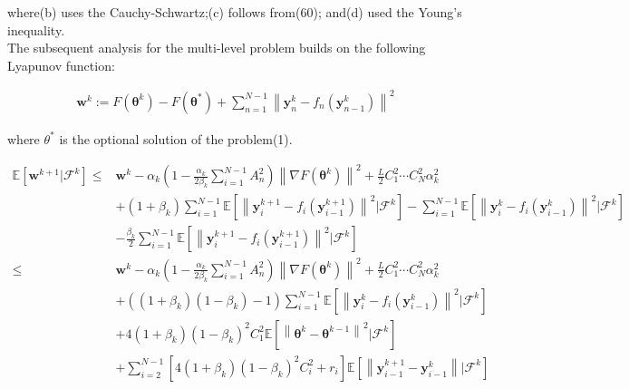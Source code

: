 where(b) uses the Cauchy-Schwartz;(c) follows from(60); and(d) used the Young's inequality.\\
The subsequent analysis for the multi-level problem builds on the following Lyapunov function:

\begin{equation*}
\begin{split}
\boldsymbol{w}^k:=F(\boldsymbol{\theta}^k)-F(\boldsymbol{\theta}^*)+\sum_{n=1}^{N-1}\left \| \boldsymbol{y}_n^k-f_n(\boldsymbol{y}_{n-1}^k) \right \|^2
\end{split}
\end{equation*}

where $\theta^*$ is the optional solution of the problem(1).

\begin{equation*}
\begin{split}
\mathbb{E}\left [ \boldsymbol{w}^{k+1}|\mathcal{F}^k \right ]\leq &\boldsymbol{w}^k-\alpha_k\left ( 1-\frac{\alpha_k}{2\beta_k}\sum_{i=1}^{N-1}A_n^2 \right )\left \| \nabla F\left ( \boldsymbol{\theta}^k \right ) \right \|^2+\frac{L}{2}C_1^2\cdots C_N^2\alpha_k^2\\
&+(1+\beta_k)\sum_{i=1}^{N-1}\mathbb{E}\left [ \left \| \boldsymbol{y}_i^{k+1}-f_i\left ( \boldsymbol{y}_{i-1}^{k+1} \right ) \right \|^2 |\mathcal{F}^k \right ]-\sum_{i=1}^{N-1}\mathbb{E}\left [ \left \| \boldsymbol{y}_i^{k}-f_i\left ( \boldsymbol{y}_{i-1}^{k} \right ) \right \|^2 |\mathcal{F}^k \right ]\\
&-\frac{\beta_k}{2}\sum_{i=1}^{N-1}\mathbb{E}\left [ \left \| \boldsymbol{y}_i^{k+1}-f_i\left ( \boldsymbol{y}_{i-1}^{k+1} \right ) \right \|^2 |\mathcal{F}^k \right ]\\
\leq & \boldsymbol{w}^k-\alpha_k\left ( 1-\frac{\alpha_k}{2\beta_k}\sum_{i=1}^{N-1}A_n^2 \right )\left \| \nabla F\left ( \boldsymbol{\theta}^k \right ) \right \|^2+\frac{L}{2}C_1^2\cdots C_N^2\alpha_k^2\\
&+\left ( \left ( 1+\beta_k \right ) \left ( 1-\beta_k \right )-1 \right )\sum_{i=1}^{N-1}\mathbb{E}\left [ \left \| \boldsymbol{y}_i^k-f_i(\boldsymbol{y}_{i-1}^k) \right \|^2|\mathcal{F}^k \right ]\\
&+4\left ( 1+\beta_k \right )(1-\beta_k)^2C_1^2\mathbb{E}\left [ \left \| \boldsymbol{\theta}^k-\boldsymbol{\theta}^{k-1} \right \|^2|\mathcal{F}^k \right ]\\
&+\sum_{i=2}^{N-1}\left [ 4\left ( 1+\beta_k \right )(1-\beta_k)^2C_i^2+r_i \right ]\mathbb{E}\left [ \left \| \boldsymbol{y}_{i-1}^{k+1}-\boldsymbol{y}_{i-1}^k \right \| |\mathcal{F}^k \right ]\\

\end{split}
\end{equation*}
